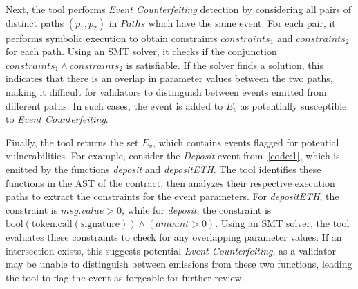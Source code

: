Next, the tool performs \emph{Event Counterfeiting} detection by considering all pairs of distinct paths \((p_1, p_2)\) in \(Paths\) which have the same event. For each pair, it performs symbolic execution to obtain constraints \(constraints_1\) and \(constraints_2\) for each path. Using an SMT solver, it checks if the conjunction \(constraints_1 \land constraints_2\) is satisfiable. If the solver finds a solution, this indicates that there is an overlap in parameter values between the two paths, making it difficult for validators to distinguish between events emitted from different paths. In such cases, the event is added to \(E_v\) as potentially susceptible to \emph{Event Counterfeiting}.

Finally, the tool returns the set \(E_v\), which contains events flagged for potential vulnerabilities. For example, consider the \emph{Deposit} event from~\cref{code:1}, which is emitted by the functions \emph{deposit} and \emph{depositETH}. The tool identifies these functions in the AST of the contract, then analyzes their respective execution paths to extract the constraints for the event parameters. For \emph{depositETH}, the constraint is \(msg.value > 0\), while for \emph{deposit}, the constraint is \(\text{bool}(\text{token.call}(\text{signature})) \land (amount > 0)\). Using an SMT solver, the tool evaluates these constraints to check for any overlapping parameter values. If an intersection exists, this suggests potential \emph{Event Counterfeiting}, as a validator may be unable to distinguish between emissions from these two functions, leading the tool to flag the event as forgeable for further review.